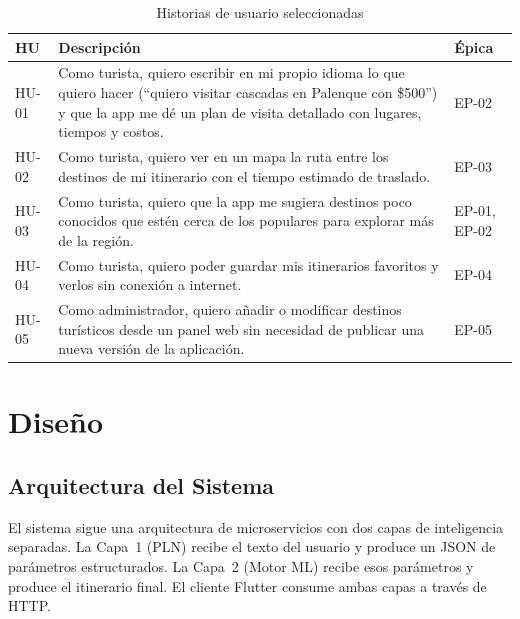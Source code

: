\documentclass[12pt,letterpaper]{report}
\begin{document}
\begin{table}[H]
\centering
\caption{Historias de usuario seleccionadas}
\label{tab:hu}
\begin{tabular}{p{1.5cm}p{10cm}p{2.5cm}}
\toprule
\textbf{HU} & \textbf{Descripción} & \textbf{Épica} \\
\midrule
HU-01 & Como turista, quiero escribir en mi propio idioma lo que quiero hacer (``quiero
  visitar cascadas en Palenque con \$500'') y que la app me dé un plan de visita detallado
  con lugares, tiempos y costos. & EP-02 \\
HU-02 & Como turista, quiero ver en un mapa la ruta entre los destinos de mi itinerario
  con el tiempo estimado de traslado. & EP-03 \\
HU-03 & Como turista, quiero que la app me sugiera destinos poco conocidos que estén cerca
  de los populares para explorar más de la región. & EP-01, EP-02 \\
HU-04 & Como turista, quiero poder guardar mis itinerarios favoritos y verlos sin
  conexión a internet. & EP-04 \\
HU-05 & Como administrador, quiero añadir o modificar destinos turísticos desde un panel
  web sin necesidad de publicar una nueva versión de la aplicación. & EP-05 \\
\bottomrule
\end{tabular}
\end{table}

\section{Diseño}

\subsection{Arquitectura del Sistema}

El sistema sigue una arquitectura de microservicios con dos capas de inteligencia separadas.
La Capa~1 (PLN) recibe el texto del usuario y produce un JSON de parámetros estructurados.
La Capa~2 (Motor ML) recibe esos parámetros y produce el itinerario final. El cliente Flutter
consume ambas capas a través de HTTP.
\end{document}
